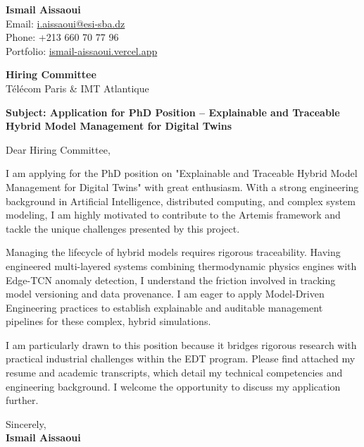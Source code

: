 \documentclass[11pt,a4paper]{article}
\begin{document}
\thispagestyle{empty}

\begin{flushright}
\textbf{Ismail Aissaoui} \\
Email: \href{mailto:i.aissaoui@esi-sba.dz}{i.aissaoui@esi-sba.dz} \\
Phone: +213 660 70 77 96 \\
Portfolio: \href{https://ismail-aissaoui.vercel.app}{ismail-aissaoui.vercel.app}
\end{flushright}

\vspace{1em}

\begin{flushleft}
\textbf{Hiring Committee} \\
Télécom Paris \& IMT Atlantique
\end{flushleft}

\vspace{1em}
\noindent\textbf{Subject: Application for PhD Position -- Explainable and Traceable Hybrid Model Management for Digital Twins}
\vspace{1em}

\noindent Dear Hiring Committee,

\vspace{1em}
\noindent
I am applying for the PhD position on "Explainable and Traceable Hybrid Model Management for Digital Twins" with great enthusiasm. With a strong engineering background in Artificial Intelligence, distributed computing, and complex system modeling, I am highly motivated to contribute to the Artemis framework and tackle the unique challenges presented by this project.

\vspace{0.5em}
\noindent
Managing the lifecycle of hybrid models requires rigorous traceability. Having engineered multi-layered systems combining thermodynamic physics engines with Edge-TCN anomaly detection, I understand the friction involved in tracking model versioning and data provenance. I am eager to apply Model-Driven Engineering practices to establish explainable and auditable management pipelines for these complex, hybrid simulations.

\vspace{0.5em}
\noindent
I am particularly drawn to this position because it bridges rigorous research with practical industrial challenges within the EDT program. Please find attached my resume and academic transcripts, which detail my technical competencies and engineering background. I welcome the opportunity to discuss my application further.

\vspace{1.5em}
\noindent
Sincerely, \\[0.5em]
\textbf{Ismail Aissaoui}
\end{document}
